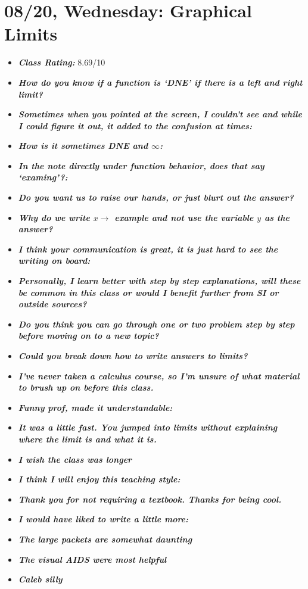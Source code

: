 \documentclass[11pt,letterpaper]{article}
\begin{document}
\newpage
\section*{08/20, Wednesday: Graphical Limits\label{08-20}}

\begin{itemize}
\item {\bfseries\itshape Class Rating:} 8.69/10
\item {\bfseries\itshape How do you know if a function is `DNE' if there is a left and right limit?}
\item {\bfseries\itshape Sometimes when you pointed at the screen, I couldn't see and while I could figure it out, it added to the confusion at times:}
\item {\bfseries\itshape How is it sometimes DNE and $\infty$:}
\item {\bfseries\itshape In the note directly under function behavior, does that say `examing'?:}

\item {\bfseries\itshape Do you want us to raise our hands, or just blurt out the answer?} 
\item {\bfseries\itshape Why do we write $x \to$ example and not use the variable $y$ as the answer?}
\item {\bfseries\itshape I think your communication is great, it is just hard to see the writing on board:} 
\item {\bfseries\itshape Personally, I learn better with step by step explanations, will these be common in this class or would I benefit further from SI or outside sources?}
\item {\bfseries\itshape Do you think you can go through one or two problem step by step before moving on to a new topic?} 
\item {\bfseries\itshape Could you break down how to write answers to limits?} 
\item {\bfseries\itshape I've never taken a calculus course, so I'm unsure of what material to brush up on before this class.} 
\item {\bfseries\itshape Funny prof, made it understandable:} 
\item {\bfseries\itshape It was a little fast. You jumped into limits without explaining where the limit is and what it is.}
\item {\bfseries\itshape I wish the class was longer}
\item {\bfseries\itshape I think I will enjoy this teaching style:}
\item {\bfseries\itshape Thank you for not requiring a textbook. Thanks for being cool.} 
\item {\bfseries\itshape I would have liked to write a little more:}
\item {\bfseries\itshape The large packets are somewhat daunting} 
\item {\bfseries\itshape The visual AIDS were most helpful}
\item {\bfseries\itshape Caleb silly}


\end{itemize}
\end{document}
